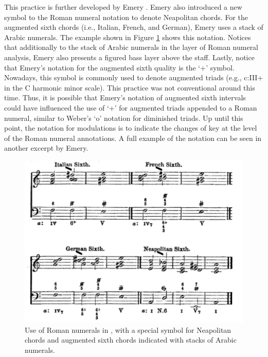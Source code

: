 This practice is further developed by Emery \cite{emery1879elements}.
Emery also introduced a new symbol to the Roman numeral notation to denote Neapolitan chords.
For the augmented sixth chords (i.e., Italian, French, and German), Emery uses a stack of Arabic numerals.
The example shown in Figure \ref{fig:emery1879elements051} shows this notation. 
Notices that additionally to the stack of Arabic numerals in the layer of Roman numeral analysis, Emery also presents a figured bass layer above the staff.
Lastly, notice that Emery's notation for the augmented sixth quality is the `+' symbol.
Nowadays, this symbol is commonly used to denote augmented triads (e.g., c:III+ in the C harmonic minor scale).
This practice was not conventional around this time.
Thus, it is possible that Emery's notation of augmented sixth intervals could have influenced the use of `+' for augmented triads appended to a Roman numeral, similar to Weber's `o' notation for diminished triads.
Up until this point, the notation for modulations is to indicate the changes of key at the level of the Roman numeral annotations. 
A full example of the notation can be seen in another excerpt by Emery.

\begin{figure}
    \centering
    \includegraphics[width=\textwidth]{figures/chapter/2/primary_sources/emery1879elements051.png}
    \caption{Use of Roman numerals in \cite{emery1879elements}, with a special symbol for Neapolitan chords and augmented sixth chords indicated with stacks of Arabic numerals.}
    \label{fig:emery1879elements051}
\end{figure}


